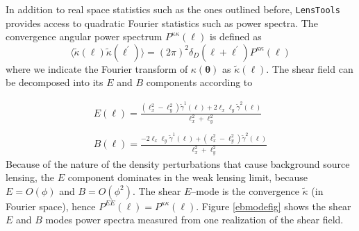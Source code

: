 \documentclass[5p]{elsarticle}
\newcommand{\LT}{\texttt{LensTools} }
\begin{document}
%
In addition to real space statistics such as the ones outlined before, \LT provides access to quadratic Fourier statistics such as power spectra. The convergence angular power spectrum $P^{\kappa\kappa}(\ell)$ is defined as  
\begin{equation}
\label{kappapsdefinition}
\langle\tilde{\kappa}(\pmb{\ell})\tilde{\kappa}(\pmb{\ell}^\prime)\rangle = (2\pi)^2\delta_D(\pmb{\ell}+\pmb{\ell}^\prime)P^{\kappa\kappa}(\ell)
\end{equation}
%
where we indicate the Fourier transform of $\kappa(\pmb{\theta})$ as $\tilde{\kappa}(\pmb{\ell})$. The shear field can be decomposed into its $E$ and $B$ components according to 

\begin{equation}
\label{ebmodeeqs}
\begin{matrix}
E(\pmb{\ell}) = \frac{(\ell_x^2-\ell_y^2)\tilde{\gamma}^1(\pmb{\ell})+2\ell_x\ell_y\tilde{\gamma}^2(\pmb{\ell})}{\ell_x^2+\ell_y^2}  \\ \\
B(\pmb{\ell}) = \frac{-2\ell_x\ell_y\tilde{\gamma}^1(\pmb{\ell})+(\ell_x^2-\ell_y^2)\tilde{\gamma}^2(\pmb{\ell})}{\ell_x^2+\ell_y^2}
\end{matrix}
\end{equation}
%
Because of the nature of the density perturbations that cause background source lensing, the $E$ component dominates in the weak lensing limit, because $E=O(\phi)$ and $B=O(\phi^2)$. The shear $E$--mode is the convergence $\tilde{\kappa}$ (in Fourier space), hence $P^{EE}(\ell)=P^{\kappa\kappa}(\ell)$. Figure \ref{ebmodefig} shows the shear $E$ and $B$ modes power spectra measured from one realization of the shear field.   
\end{document}

